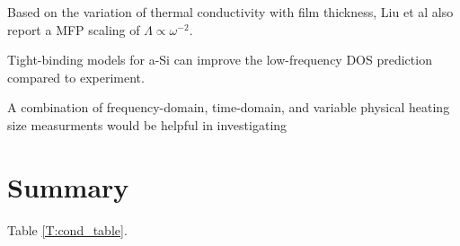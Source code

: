 \documentclass[aps,prb,twocolumn,superscriptaddress,footinbib,amsmath,amssymb,floatfix]{revtex4}
\begin{document}
Based on the variation of thermal conductivity with film thickness, 
Liu et al also report a MFP scaling of 
$\Lambda \propto \omega^{-2}$.\cite{liu_high_2009} 

Tight-binding models for a-Si can improve the low-frequency 
DOS prediction compared to experiment.\cite{feldman_tight-binding_2004}


A combination of frequency-domain, time-domain, and variable 
physical heating size measurments would be helpful in investigating
\cite{koh_frequency_2007,siemens_quasi-ballistic_2010,
minnich_thermal_2011,regner_broadband_2013}


\section{\label{S:Lifetimes}Summary}

Table \ref{T:cond_table}.

\end{document}
